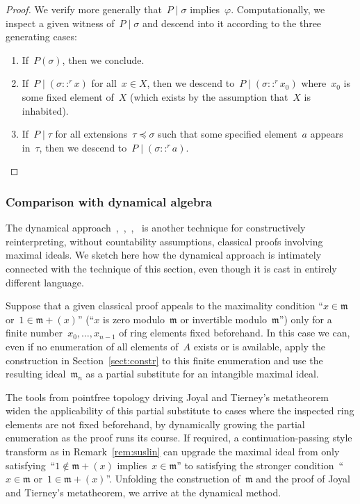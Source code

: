\documentclass[com,11pt,crcready]{iosart2x}
\theoremstyle{definition}
\theoremstyle{plain}
\theoremstyle{remark}
\newcommand{\mmm}{\mathfrak{m}}
\renewcommand{\_}{\mathpunct{.}\,}
\begin{document}
\begin{proof}We verify more generally that~$P \mid \sigma$ implies~$\varphi$.
Computationally, we inspect a given witness of~$P \mid \sigma$ and descend into
it according to the three generating cases:
\begin{enumerate}
\item If~$P(\sigma)$, then we conclude.
\item
If~$P \mid (\sigma ::^r x)$ for all~$x \in X$, then we descend to~$P \mid
(\sigma ::^r x_0)$ where~$x_0$ is some fixed element of~$X$ (which exists by
the assumption that~$X$ is inhabited).
\item If~$P \mid \tau$ for all
extensions~$\tau \preceq \sigma$ such that some specified element~$a$ appears
in~$\tau$, then we descend to~$P \mid (\sigma ::^r a)$.
\end{enumerate}
\end{proof}


\subsubsection{Comparison with dynamical algebra}

The dynamical approach~\cite[Section~XV.6]{lombardi-quitte:constructive-algebra},~\cite{coquand-lombardi-roy:dynamicalmethod},~\cite{yengui:constructive},~\cite{duval:about}
is another technique for constructively reinterpreting,
without countability assumptions, classical proofs involving maximal ideals.
We sketch here how the dynamical approach is intimately connected with the
technique of this section, even though it is cast in entirely different
language.

Suppose that a given classical proof appeals to the maximality condition ``$x \in \mmm$
or~$1 \in \mmm + (x)$'' (``$x$ is zero modulo~$\mmm$ or invertible
modulo~$\mmm$'') only for a finite number~$x_0,\ldots,x_{n-1}$ of ring elements
fixed beforehand. In this case we can, even if no enumeration of all elements
of~$A$ exists or is available, apply the construction in Section~\ref{sect:constr} to
this finite enumeration and use the resulting ideal~$\mmm_n$ as a partial
substitute for an intangible maximal ideal.

The tools from pointfree topology
driving Joyal and Tierney's metatheorem widen the applicability of this partial
substitute to cases where the inspected ring elements are
not fixed beforehand, by dynamically growing the partial enumeration as the
proof runs its course. If required, a continuation-passing style transform as
in Remark~\ref{rem:suslin} can upgrade the maximal ideal from only
satisfying~``$1 \not\in \mmm + (x)$ implies~$x \in
\mmm$'' to satisfying the stronger condition~``$x \in \mmm$ or~$1 \in \mmm
+ (x)$''.
%
Unfolding the construction of~$\mmm$ and the proof of Joyal
and Tierney's metatheorem, we arrive at the dynamical method.
\end{document}
